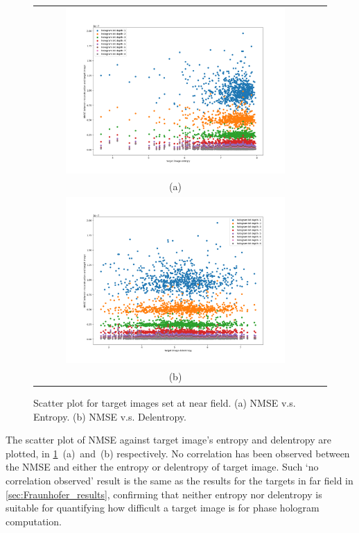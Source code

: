 	\begin{figure} [H]
		\begin{center}
			\begin{tabular}{c c}
				\includegraphics[trim={80 50 90 70}, clip, width = 0.8\textwidth]{GS_Fresnel0.1_NMSE_VS_Entropy.png} \\
				(a)\\
				\includegraphics[trim={80 50 90 70}, clip, width = 0.8\textwidth]{GS_Fresnel0.1_NMSE_VS_Delentropy.png} \\
				(b)
			\end{tabular}
			\caption{\label{fig:GS_Fresnel0.1_NMSE_VS_Entropy_Delentropy} Scatter plot for target images set at near field. (a) NMSE v.s. Entropy. (b) NMSE v.s. Delentropy.}
		\end{center}
	\end{figure}

	The scatter plot of NMSE against target image's entropy and delentropy are plotted, in \cref{fig:GS_Fresnel0.1_NMSE_VS_Entropy_Delentropy}~(a)~and~(b) respectively. No correlation has been observed between the NMSE and either the entropy or delentropy of target image. Such `no correlation observed' result is the same as the results for the targets in far field in \cref{sec:Fraunhofer_results}, confirming that neither entropy nor delentropy is suitable for quantifying how difficult a target image is for phase hologram computation.

